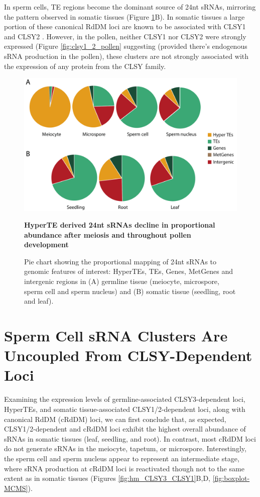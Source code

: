 In sperm cells, TE regions become the dominant source of 24nt sRNAs, mirroring the pattern observed in somatic tissues (Figure \ref{fig:sRNA_pie}B). In somatic tissues a large portion of these canonical RdDM loci are known to be associated with CLSY1 and CLSY2 \citep{RN23}. However, in the pollen, neither CLSY1 nor CLSY2 were strongly expressed (Figure \ref{fig:clsy1_2_pollen} suggesting (provided there's endogenous sRNA production in the pollen), these clusters are not strongly associated with the expression of any protein from the CLSY family.

\begin{figure}[htbp!] 
\centering    
    \includegraphics[width=1\textwidth]{Chapter2/Figs/Figure7_Pie_charts.pdf}
\caption{\textbf{HyperTE derived 24nt sRNAs decline in proportional abundance after meiosis and throughout pollen development}}
\label{fig:sRNA_pie}
\captionsetup{font=small}
    \caption*{Pie chart showing the proportional mapping of 24nt sRNAs to genomic features of interest: HyperTEs, TEs, Genes, MetGenes and intergenic regions in (A) germline tissue (meiocyte, microspore, sperm cell and sperm nucleus) and (B) somatic tissue (seedling, root and leaf).}
\end{figure}

\section{Sperm Cell sRNA Clusters Are Uncoupled From CLSY-Dependent Loci}

Examining the expression levels of germline-associated CLSY3-dependent loci, HyperTEs, and somatic tissue-associated CLSY1/2-dependent loci, along with canonical RdDM (cRdDM) loci, we can first conclude that, as expected, CLSY1/2-dependent and cRdDM loci exhibit the highest overall abundance of sRNAs in somatic tissues (leaf, seedling, and root). In contrast, most cRdDM loci do not generate sRNAs in the meiocyte, tapetum, or microspore. Interestingly, the sperm cell and sperm nucleus appear to represent an intermediate stage, where sRNA production at cRdDM loci is reactivated though not to the same extent as in somatic tissues (Figures \ref{fig:hm_CLSY3_CLSY1}B,D, \ref{fig:boxplot-MCMS}).

